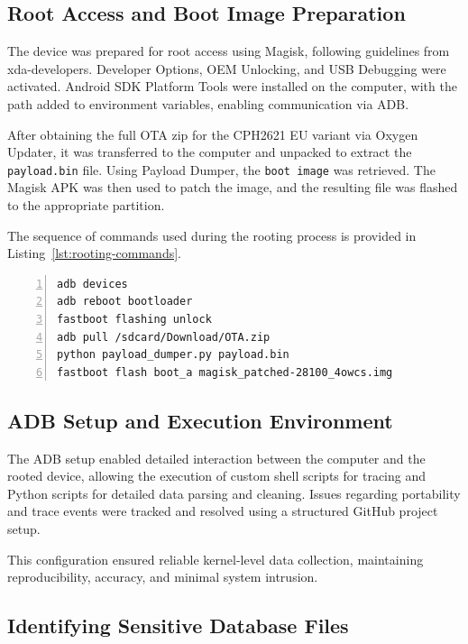 \documentclass[a4paper,12pt]{report}
\begin{document}
\subsection{Root Access and Boot Image Preparation}

The device was prepared for root access using Magisk, following guidelines from xda-developers. Developer Options, OEM Unlocking, and USB Debugging were activated. Android SDK Platform Tools were installed on the computer, with the path added to environment variables, enabling communication via ADB.

After obtaining the full OTA zip for the CPH2621 EU variant via Oxygen Updater, it was transferred to the computer and unpacked to extract the \texttt{payload.bin} file. Using Payload Dumper, the \texttt{boot image} was retrieved. The Magisk APK was then used to patch the image, and the resulting file was flashed to the appropriate partition.

The sequence of commands used during the rooting process is provided in Listing~\ref{lst:rooting-commands}.

\begin{lstlisting}[language=bash,caption={Rooting commands for device setup},label={lst:rooting-commands},numbers=left]
adb devices
adb reboot bootloader
fastboot flashing unlock
adb pull /sdcard/Download/OTA.zip
python payload_dumper.py payload.bin
fastboot flash boot_a magisk_patched-28100_4owcs.img
\end{lstlisting}

\subsection{ADB Setup and Execution Environment}

The ADB setup enabled detailed interaction between the computer and the rooted device, allowing the execution of custom shell scripts for tracing and Python scripts for detailed data parsing and cleaning. Issues regarding portability and trace events were tracked and resolved using a structured GitHub project setup.

This configuration ensured reliable kernel-level data collection, maintaining reproducibility, accuracy, and minimal system intrusion.

\subsection{Identifying Sensitive Database Files}
\end{document}
